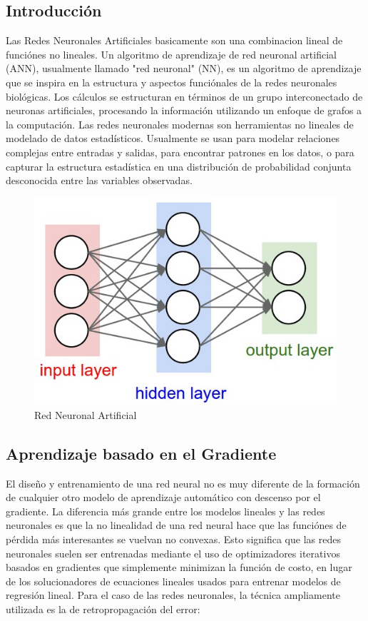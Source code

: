 \documentclass[a4paper,11pt,spanish]{book}
\begin{document}
      \subsection{Introducción}
	Las Redes Neuronales Artificiales basicamente son una combinacion lineal de funciónes no lineales.
	Un algoritmo de aprendizaje de red neuronal artificial (ANN), usualmente llamado "red neuronal" (NN), es un algoritmo de aprendizaje que se inspira en la estructura y aspectos funciónales
	de la redes neuronales biológicas. Los cálculos se estructuran en términos de un grupo interconectado de neuronas artificiales, procesando la información utilizando un enfoque de grafos
	a la computación. Las redes neuronales modernas son herramientas no lineales de modelado de datos estadísticos. Usualmente se usan para modelar relaciones complejas entre entradas y salidas,
	para encontrar patrones en los datos, o para capturar la estructura estadística en una distribución de probabilidad conjunta desconocida entre las variables observadas. \\
	\begin{figure}[h]
	  \includegraphics[scale=0.5]{./img/stanford_neural_net.jpeg}
	  \caption{Red Neuronal Artificial}
	  \label{fig:neural_network}
	\end{figure}

      \subsection{Aprendizaje basado en el Gradiente}
	El diseño y entrenamiento de una red neural no es muy diferente de la formación de cualquier otro modelo de aprendizaje automático con descenso por el gradiente.
	La diferencia más grande entre los modelos lineales y las redes neuronales es que la no linealidad de una red neural hace que las funciónes de pérdida
	más interesantes se vuelvan no convexas. Esto significa que las redes neuronales suelen ser entrenadas mediante el uso de optimizadores iterativos basados ​​en gradientes
	que simplemente minimizan la función de costo, en lugar de los solucionadores de ecuaciones lineales usados ​​para entrenar modelos de regresión lineal. Para el caso de las 
	redes neuronales, la técnica ampliamente utilizada es la de retropropagación del error:
\end{document}
